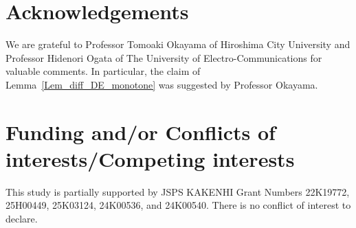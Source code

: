 \documentclass[pdflatex,sn-mathphys-num]{sn-jnl}%
\theoremstyle{thmstyleone}%
\theoremstyle{thmstyletwo}%
\theoremstyle{thmstylethree}%
\begin{document}
\section*{Acknowledgements}
We are grateful to Professor Tomoaki Okayama of Hiroshima City University
and Professor Hidenori Ogata of The University of Electro-Communications
for valuable comments.  In particular, the claim of Lemma~\ref{Lem_diff_DE_monotone} was suggested
by Professor Okayama.

\section*{Funding and/or Conflicts of interests/Competing interests}
This study is partially supported by JSPS KAKENHI Grant Numbers 22K19772, 25H00449, 25K03124, 24K00536, and 24K00540. 
There is no conflict of interest to declare.
\end{document}
